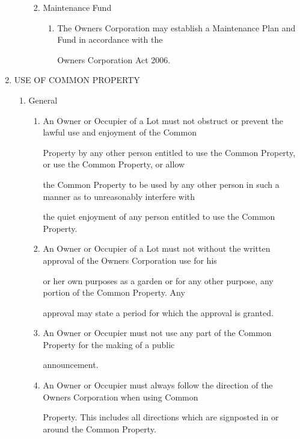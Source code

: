 \documentclass{article}
\begin{document}
\begin{enumerate}[label=\arabic*.]
\begin{enumerate}[label=\arabic{enumi}.\arabic*.]
\begin{enumerate}[label=(\arabic*)]
\begin{enumerate}[label=(\alph*)]
\end{enumerate}
\item  Maintenance Fund 

\begin{enumerate}[label=(\alph*)]
\item  The Owners Corporation may establish a Maintenance Plan and Fund in accordance with the 

Owners Corporation Act 2006. 

\end{enumerate}
\end{enumerate}
\end{enumerate}
\item  USE OF COMMON PROPERTY 

\begin{enumerate}[label=\arabic{enumi}.\arabic*.]
\item  General 

\begin{enumerate}[label=(\arabic*)]
\item  An Owner or Occupier of a Lot must not obstruct or prevent the lawful use and enjoyment of the Common 

Property by any other person entitled to use the Common Property, or use the Common Property, or allow 

the Common Property to be used by any other person in such a manner as to unreasonably interfere with 

the quiet enjoyment of any person entitled to use the Common Property. 

\item  An Owner or Occupier of a Lot must not without the written approval of the Owners Corporation use for his 

or her own purposes as a garden or for any other purpose, any portion of the Common Property. Any 

approval may state a period for which the approval is granted. 

\item  An Owner or Occupier must not use any part of the Common Property for the making of a public 

announcement. 

\item  An Owner or Occupier must always follow the direction of the Owners Corporation when using Common 

Property. This includes all directions which are signposted in or around the Common Property. 


\end{enumerate}
\end{enumerate}
\end{enumerate}
\end{document}
